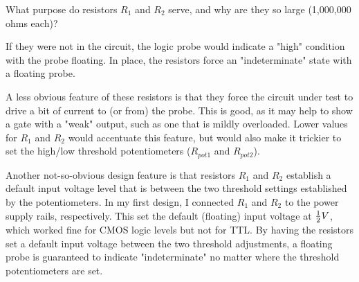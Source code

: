 

What purpose do resistors $R_1$ and $R_2$ serve, and why are they so large (1,000,000 ohms each)?







If they were not in the circuit, the logic probe would indicate a "high" condition with the probe floating.  In place, the resistors force an "indeterminate" state with a floating probe.







A less obvious feature of these resistors is that they force the circuit under test to drive a bit of current to (or from) the probe.  This is good, as it may help to show a gate with a "weak" output, such as one that is mildly overloaded.  Lower values for $R_1$ and $R_2$ would accentuate this feature, but would also make it trickier to set the high/low threshold potentiometers ($R_{pot1}$ and $R_{pot2}$).

Another not-so-obvious design feature is that resistors $R_1$ and $R_2$ establish a default input voltage level that is between the two threshold settings established by the potentiometers.  In my first design, I connected $R_1$ and $R_2$ to the power supply rails, respectively.  This set the default (floating) input voltage at ${1 \over 2} V$, which worked fine for CMOS logic levels but not for TTL.  By having the resistors set a default input voltage between the two threshold adjustments, a floating probe is guaranteed to indicate "indeterminate" no matter where the threshold potentiometers are set.



